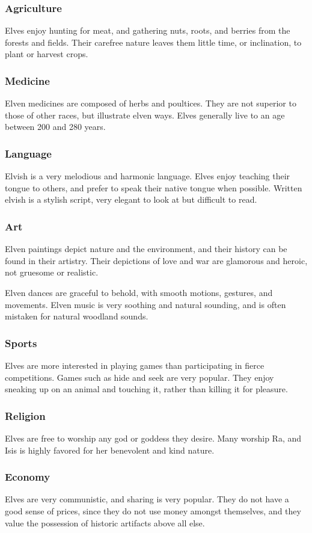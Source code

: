 \begin{multicols*}{2}
\subsubsection{Agriculture}
Elves enjoy hunting for meat, and gathering nuts, roots, and berries from the forests and fields. Their carefree nature leaves them little time, or inclination, to plant or  harvest crops.
\subsubsection{Medicine}
Elven medicines are composed of herbs and poultices. They are not superior to those of other races, but illustrate elven ways. Elves generally live to an age between 200 and 280 years.
\subsubsection{Language}
Elvish is a very melodious and harmonic language. Elves enjoy teaching their tongue to others, and prefer to speak their native tongue when possible. Written elvish is a stylish script, very elegant to look at but difficult to read.
\subsubsection{Art}
Elven paintings depict nature and the environment, and their history can be found in their artistry. Their depictions of love and war are glamorous and heroic, not gruesome or realistic.

Elven dances are graceful to behold, with smooth motions, gestures, and movements. Elven music is very soothing and natural sounding, and is often mistaken for natural woodland sounds.
\subsubsection{Sports}
Elves are more interested in playing games than participating in fierce competitions. Games such as hide and seek are very popular. They enjoy sneaking up on an animal and touching it, rather than killing it for pleasure.
\subsubsection{Religion}
Elves are free to worship any god or goddess they desire. Many worship Ra, and Isis is highly favored for her benevolent and kind nature.
\subsubsection{Economy}
Elves are very communistic, and sharing is very popular. They do not have a good sense of prices, since they do not use money amongst themselves, and they value the possession of historic artifacts above all else.

\end{multicols*}
